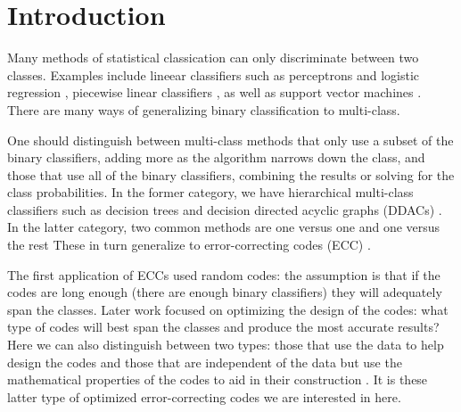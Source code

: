 
\section{Introduction}

Many methods of statistical classication can only discriminate between two classes. 
Examples include lineear classifiers such as perceptrons and logistic regression \citep{Michie_etal1994}, 
piecewise linear classifiers \citep{Herman_Yeung1992,Mills2018},
as well as support vector machines \citep{kernel_intro}.
There are many ways of generalizing binary classification to 
multi-class.

One should distinguish between multi-class methods that only use a subset
of the binary classifiers, adding more as the algorithm narrows down the
class, and those that use all of the binary classifiers, combining the results
or solving for the class probabilities.
In the former category, we have hierarchical multi-class classifiers 
such as decision trees \citep{Cheong_etal2004,Lee_Oh2003} and decision
directed acyclic graphs (DDACs) \citep{Platt_etal2000}.
In the latter category,
two common methods are one versus one and one versus the rest \citep{Hsu_Lin2002}
These in turn generalize to error-correcting codes (ECC) \citep{Dietterich_Bakiri1995}.

The first application of ECCs used random codes:
the assumption is that if the codes are long enough (there are enough binary classifiers)
they will adequately span the classes.
Later work focused on optimizing the design of the codes: what type of
codes will best span the classes and produce the most accurate results?
Here we can also distinguish between two types: those that use the data
to help design the codes \citep{Crammer_Singer2002,Zhou_etal2008,Zhong_Cheriet2013}
and those that are independent of the data but use the mathematical 
properties of the codes to aid in their construction \citep{Allwein_etal2000,Windeatt_Ghaderi2002,Zhou_etal2019}.
It is these latter type of optimized error-correcting codes we are interested in here.

